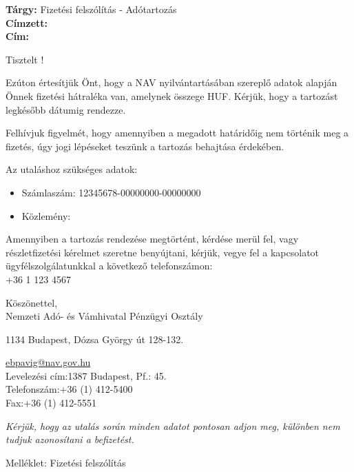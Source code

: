\documentclass[a4paper,12pt]{letter}
\begin{document}
\pagestyle{fancy}
\fancyhf{}
\fancyhead[R]{\today}
\fancyfoot[C]{\thepage}


\begin{flushleft}
    \textbf{Tárgy:} Fizetési felszólítás - Adótartozás \\ [1em] 
    \textbf{Címzett:} \nev \\ [1em] 
    \textbf{Cím:} \cim
\end{flushleft}

\vspace{1.5em}

Tisztelt \nev!

Ezúton értesítjük Önt, hogy a NAV nyilvántartásában szereplő adatok alapján Önnek fizetési hátraléka van, amelynek összege \osszeg HUF. Kérjük, hogy a tartozást legkésőbb \hatarido dátumig rendezze.

Felhívjuk figyelmét, hogy amennyiben a megadott határidőig nem történik meg a fizetés, úgy jogi lépéseket teszünk a tartozás behajtása érdekében.

Az utaláshoz szükséges adatok:
\begin{itemize}
    \item Számlaszám: 12345678-00000000-00000000
    \item Közlemény: \kozlemeny
\end{itemize}

Amennyiben a tartozás rendezése megtörtént, kérdése merül fel, vagy részletfizetési kérelmet szeretne benyújtani, kérjük, vegye fel a kapcsolatot ügyfélszolgálatunkkal a következő telefonszámon: \\
+36 1 123 4567

Köszönettel,\\
Nemzeti Adó- és Vámhivatal Pénzügyi Osztály \\
\signature{Nemzeti Adó- és Vámhivatal Pénzügyi Osztály}
1134 Budapest, Dózsa György út 128-132. \\
\address{NAV Központi Hivatal, 1134 Budapest, Dózsa György út 128-132. }
 \href{mailto:ebpavig@nav.gov.hu}{ebpavig@nav.gov.hu} \\Levelezési cím:1387 Budapest, Pf.: 45. \\Telefonszám:+36 (1) 412-5400 \\Fax:+36 (1) 412-5551
\date{\today}

\vspace{1.5em}
\textit{Kérjük, hogy az utalás során minden adatot pontosan adjon meg, különben nem tudjuk azonosítani a befizetést.}

\vspace{1em}
Melléklet: Fizetési felszólítás
\end{document}
